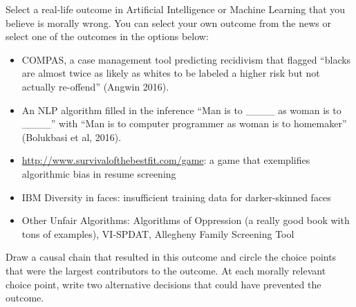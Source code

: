 \documentclass[submit]{harvardml}
\begin{document}
\newpage

\begin{problem}

Select a real-life outcome in Artificial Intelligence or Machine Learning 
that you believe is morally wrong. You can select your own outcome from 
the news or select one of the outcomes in the options below:

\begin{itemize}
    \item COMPAS, a case management tool predicting recidivism that 
        flagged “blacks are almost twice as likely as whites to be 
        labeled a higher risk but not actually re-offend” (Angwin 
        2016).
        
    \item An NLP algorithm filled in the inference “Man is to 
        \_\_\_\_ as woman is to \_\_\_\_” with “Man is 
        to computer programmer as woman is to homemaker” (Bolukbasi 
        et al, 2016).
        
    \item \url{http://www.survivalofthebestfit.com/game}: a game that 
        exemplifies algorithmic bias in resume screening
        
    \item IBM Diversity in faces: insufficient training data for 
        darker-skinned faces
        
    \item Other Unfair Algorithms: Algorithms of Oppression (a really 
        good book with tons of examples), VI-SPDAT, Allegheny Family 
        Screening Tool
        
\end{itemize}
Draw a causal chain that resulted in this outcome and circle the choice points that were the largest contributors to the outcome. At each morally relevant choice point, write two alternative decisions that could have prevented the outcome.

\end{problem}

\newpage
\end{document}
